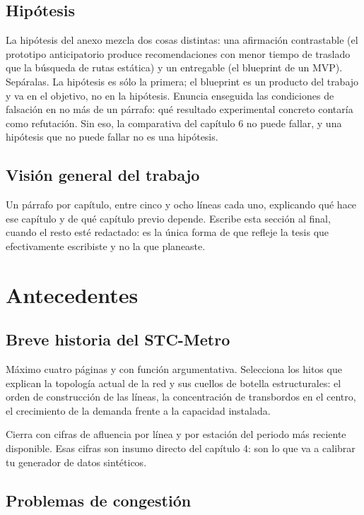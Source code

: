\documentclass[letterpaper,12pt,oneside]{book}
\theoremstyle{definition}
\theoremstyle{plain}
\theoremstyle{remark}
\begin{document}
\section{Hipótesis}
La hipótesis del anexo mezcla dos cosas distintas: una afirmación contrastable (el prototipo anticipatorio produce recomendaciones con menor tiempo de traslado que la búsqueda de rutas estática) y un entregable (el blueprint de un MVP). Sepáralas. La hipótesis es sólo la primera; el blueprint es un producto del trabajo y va en el objetivo, no en la hipótesis.
Enuncia enseguida las condiciones de falsación en no más de un párrafo: qué resultado experimental concreto contaría como refutación. Sin eso, la comparativa del capítulo 6 no puede fallar, y una hipótesis que no puede fallar no es una hipótesis.

\section{Visión general del trabajo}

Un párrafo por capítulo, entre cinco y ocho líneas cada uno, explicando qué hace ese capítulo y de qué capítulo previo depende. Escribe esta sección al final, cuando el resto esté redactado: es la única forma de que refleje la tesis que efectivamente escribiste y no la que planeaste.

\chapter{Antecedentes}

\section{Breve historia del STC-Metro}
Máximo cuatro páginas y con función argumentativa. Selecciona los hitos que explican la topología actual de la red y sus cuellos de botella estructurales: el orden de construcción de las líneas, la concentración de transbordos en el centro, el crecimiento de la demanda frente a la capacidad instalada.

Cierra con cifras de afluencia por línea y por estación del periodo más reciente disponible. Esas cifras son insumo directo del capítulo 4: son lo que va a calibrar tu generador de datos sintéticos.

\section{Problemas de congestión}
\end{document}
